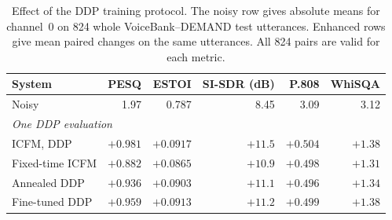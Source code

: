 \begin{table}[htbp]\centering\small
\setlength{\tabcolsep}{4pt}
\begin{tabular}{lrrrrr}\toprule
System & PESQ & ESTOI & SI-SDR (dB) & P.808 & WhiSQA \\ \midrule
Noisy & 1.97 & 0.787 & 8.45 & 3.09 & 3.12 \\
\midrule\multicolumn{6}{l}{\itshape One DDP evaluation} \\
ICFM, DDP & \cellcolor{bestblue}$+0.981$ & \cellcolor{bestblue}$+0.0917$ & \cellcolor{bestblue}$+11.5$ & \cellcolor{bestblue}$+0.504$ & \cellcolor{bestblue}$+1.38$ \\
Fixed-time ICFM & \cellcolor{worstred}$+0.882$ & \cellcolor{worstred}$+0.0865$ & \cellcolor{worstred}$+10.9$ & $+0.498$ & \cellcolor{worstred}$+1.31$ \\
Annealed DDP & $+0.936$ & $+0.0903$ & $+11.1$ & \cellcolor{worstred}$+0.496$ & \cellcolor{secondorange}$+1.34$ \\
Fine-tuned DDP & \cellcolor{secondorange}$+0.959$ & \cellcolor{secondorange}$+0.0913$ & \cellcolor{secondorange}$+11.2$ & \cellcolor{secondorange}$+0.499$ & \cellcolor{bestblue}$+1.38$ \\
\bottomrule\end{tabular}
\caption{Effect of the DDP training protocol. The noisy row gives absolute means for channel~0 on 824 whole VoiceBank--DEMAND test utterances. Enhanced rows give mean paired changes on the same utterances. All 824 pairs are valid for each metric.}\label{tab:cfmse-ddp}
\end{table}
